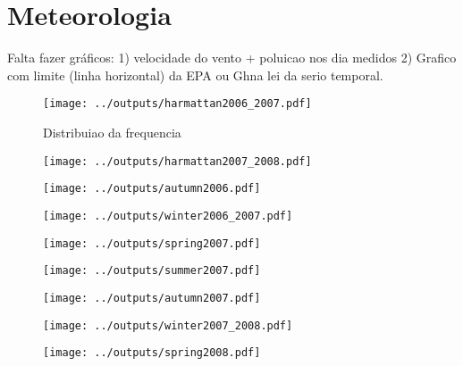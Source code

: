 \chapter{Meteorologia}

Falta fazer gráficos:
1) velocidade do vento + poluicao nos dia medidos
2) Grafico com limite (linha horizontal) da EPA ou Ghna lei da serio temporal.

\begin{figure}[H]
\begin{center}
  \texttt{[image: ../outputs/harmattan2006\_2007.pdf]}
\end{center}
\caption{Distribuiao da frequencia}
\end{figure}

\begin{figure}[H]
\begin{center}
  \texttt{[image: ../outputs/harmattan2007\_2008.pdf]}
\end{center}
\end{figure}

\begin{figure}[H]
\begin{center}
  \texttt{[image: ../outputs/autumn2006.pdf]}
\end{center}
\end{figure}

\begin{figure}[H]
\begin{center}
  \texttt{[image: ../outputs/winter2006\_2007.pdf]}
\end{center}
\end{figure}

\begin{figure}[H]
\begin{center}
  \texttt{[image: ../outputs/spring2007.pdf]}
\end{center}
\end{figure}

\begin{figure}[H]
\begin{center}
  \texttt{[image: ../outputs/summer2007.pdf]}
\end{center}
\end{figure}

\begin{figure}[H]
\begin{center}
  \texttt{[image: ../outputs/autumn2007.pdf]}
\end{center}
\end{figure}

\begin{figure}[H]
\begin{center}
  \texttt{[image: ../outputs/winter2007\_2008.pdf]}
\end{center}
\end{figure}

\begin{figure}[H]
\begin{center}
  \texttt{[image: ../outputs/spring2008.pdf]}
\end{center}
\end{figure}
